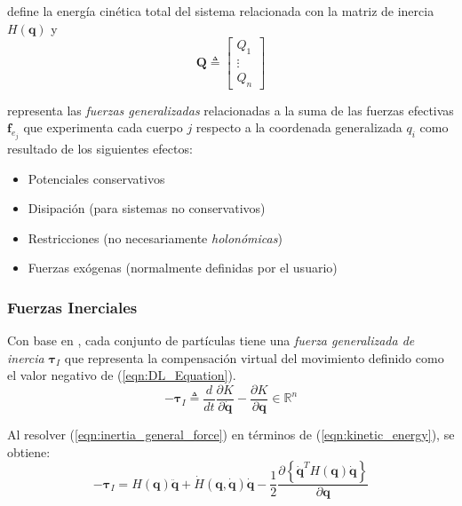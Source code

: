     define la energía cinética total del sistema relacionada con la matriz de inercia $H(\boldsymbol{q})$ y 
    \begin{equation}
        \label{eqn:fuerzas_generalizadas}
         \boldsymbol{Q} \triangleq \begin{bmatrix} Q_1 \\ \vdots \\ Q_n \end{bmatrix}
    \end{equation}

    representa las \emph{fuerzas generalizadas}
    relacionadas a la suma de las fuerzas efectivas $\boldsymbol{f}_{e_j}$ que experimenta cada cuerpo $j$ respecto a la coordenada generalizada $q_i$
    como resultado de los siguientes efectos:
    \begin{itemize}
        \item Potenciales conservativos
        \item Disipación (para sistemas no conservativos)
        \item Restricciones (no necesariamente \emph{holonómicas})
        \item Fuerzas exógenas (normalmente definidas por el usuario)
    \end{itemize}

    \subsubsection{Fuerzas Inerciales}   
    \noindent Con base en \cite{3DMotion}, cada conjunto de partículas tiene una \emph{fuerza generalizada de inercia} $\boldsymbol{\tau}_I$ que representa la compensación
    virtual del movimiento definido como el valor negativo de (\ref{eqn:DL_Equation}). 
    \begin{equation}
        \label{eqn:inertia_general_force}
        -\boldsymbol{\tau}_I \triangleq \frac{d}{dt} \frac{\partial K}{\partial \boldsymbol{\dot{q}}} - \frac{\partial K}{\partial \boldsymbol{q}} \in \mathbb{R}^n
    \end{equation}
    
    Al resolver (\ref{eqn:inertia_general_force}) en términos de (\ref{eqn:kinetic_energy}), se obtiene:
    \begin{equation}
        \label{eqn:inertial_terms}
        -\boldsymbol{\tau}_I = H(\boldsymbol{q}) \boldsymbol{\ddot{q}} + \dot{H}(\boldsymbol{q}, \boldsymbol{{\dot{q}}}) \boldsymbol{{\dot{q}}}
        - \frac{1}{2} \frac{\partial \left \{ \boldsymbol{\dot{q}}^T H(\boldsymbol{q}) \boldsymbol{\dot{q}} \right \} }{\partial \boldsymbol{q}}
    \end{equation}

